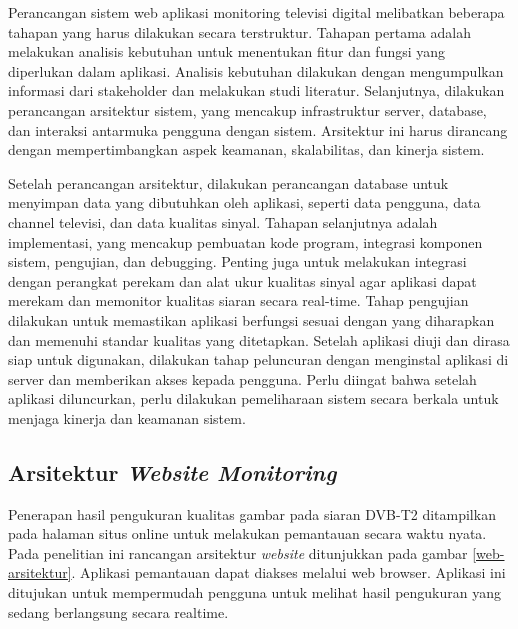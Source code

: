 Perancangan sistem web aplikasi monitoring televisi digital melibatkan beberapa tahapan yang harus dilakukan secara terstruktur. Tahapan pertama adalah melakukan analisis kebutuhan untuk menentukan fitur dan fungsi yang diperlukan dalam aplikasi. Analisis kebutuhan dilakukan dengan mengumpulkan informasi dari stakeholder dan melakukan studi literatur. Selanjutnya, dilakukan perancangan arsitektur sistem, yang mencakup infrastruktur server, database, dan interaksi antarmuka pengguna dengan sistem. Arsitektur ini harus dirancang dengan mempertimbangkan aspek keamanan, skalabilitas, dan kinerja sistem.

Setelah perancangan arsitektur, dilakukan perancangan database untuk menyimpan data yang dibutuhkan oleh aplikasi, seperti data pengguna, data channel televisi, dan data kualitas sinyal. Tahapan selanjutnya adalah implementasi, yang mencakup pembuatan kode program, integrasi komponen sistem, pengujian, dan debugging. Penting juga untuk melakukan integrasi dengan perangkat perekam dan alat ukur kualitas sinyal agar aplikasi dapat merekam dan memonitor kualitas siaran secara real-time. Tahap pengujian dilakukan untuk memastikan aplikasi berfungsi sesuai dengan yang diharapkan dan memenuhi standar kualitas yang ditetapkan. Setelah aplikasi diuji dan dirasa siap untuk digunakan, dilakukan tahap peluncuran dengan menginstal aplikasi di server dan memberikan akses kepada pengguna. Perlu diingat bahwa setelah aplikasi diluncurkan, perlu dilakukan pemeliharaan sistem secara berkala untuk menjaga kinerja dan keamanan sistem.

\subsection{Arsitektur \textit{Website Monitoring}}

Penerapan hasil pengukuran kualitas gambar pada siaran DVB-T2 ditampilkan pada halaman situs online untuk melakukan pemantauan secara waktu nyata. Pada penelitian ini rancangan arsitektur \textit{website} ditunjukkan pada gambar \ref{web-arsitektur}. Aplikasi pemantauan dapat diakses melalui web browser. Aplikasi ini ditujukan untuk mempermudah pengguna untuk melihat hasil pengukuran yang sedang berlangsung secara realtime. 

